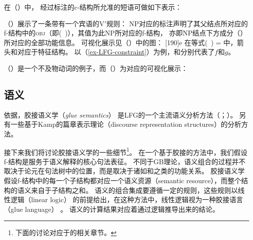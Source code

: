 在（）中，
经过标注的c-结构所允准的短语可做如下表示：
\ea
{}%
\hspace*{3em}%
\z

\noindent
（）展示了一条带有一个宾语的V$'$规则：
\ea
{}
\z
%
NP对应的标注声明了其父结点所对应的f-结构中的\textsc{obj}（即\mbox{(\up\ \lfgobj)}），其值为此NP所对应的f-结构，
亦即NP结点下方成分（\down）所对应的全部功能信息。
可视化展示见（）中的图：
\ea
{}%
\hspace*{3em}%
[190]{e}
\z
在等式(\up\ \lfgobj) = \down{}中，箭头\up 和\down 对应于特征结构。
以（\ref{ex-LFG-constraint}）为例，\up 和\down 分别代表了$f$和$g$。

（）是一个不及物动词的例子，而（）为对应的可视化展示：

\ea
{}
\z

\ea
{}
\hspace*{4em}
\z 
{}

\subsection{语义}
\label{lfg-semantics}
\label{glue-semantics}

依据\citet[--92]{Dalrymple2006a}，胶接语义学（\emph{glue semantics}）
是LFG的一个主流语义分析方法（\citealp*{DLS93a-u}；\citealp[\S~8]{Dalrymple2001a-u}）。
另有一些基于Kamp的篇章表示理论（discourse representation structures）\citep{KR93a}的分析方法\citep{FR83b,FR83a}。

接下来我们将讨论胶接语义学的一些细节\footnote{%
下面的讨论对应于的相关章节。
}。
在一个基于胶接的方法中，我们假设f-结构是服务于语义解释的核心句法表征。
不同于GB理论，语义组合的过程并不取决于论元在句法树中的位置，而是取决于诸如\lfgsubj 和\lfgobj 之类的功能关系。 
胶接语义学假设f-结构中的每一个子结构都对应一个语义资源（semantic resource），而整个结构的语义来自于子结构之和。
语义的组合集成要遵循一定的规则，这些规则以线性逻辑（linear logic）
的前提给出，在这种方法中，线性逻辑视为一种胶接语言（glue language）
。
语义的计算结果对应着通过逻辑推导出来的结论。

